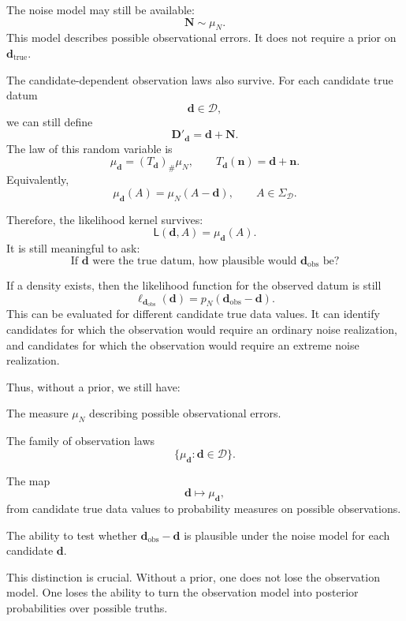 \documentclass[11pt]{article}
\newcommand{\Dspace}{\mathcal D}
\newcommand{\SigmaD}{\Sigma_{\mathcal D}}
\newcommand{\muN}{\mu_N}
\newcommand{\Dobsrand}{\mathbf D'}
\newcommand{\Nrand}{\mathbf N}
\newcommand{\dtrue}{\mathbf d_{\mathrm{true}}}
\newcommand{\dobs}{\mathbf d_{\mathrm{obs}}}
\begin{document}
The noise model may still be available:
\[
    \Nrand\sim\muN.
\]
This model describes possible observational errors. It does not require a prior on \(\dtrue\).

The candidate-dependent observation laws also survive. For each candidate true datum
\[
    \mathbf d\in\Dspace,
\]
we can still define
\[
    \Dobsrand_{\mathbf d}
    =
    \mathbf d+\Nrand.
\]
The law of this random variable is
\[
    \mu_{\mathbf d}
    =
    (T_{\mathbf d})_{\#}\muN,
    \qquad
    T_{\mathbf d}(\mathbf n)=\mathbf d+\mathbf n.
\]
Equivalently,
\[
    \mu_{\mathbf d}(A)
    =
    \muN(A-\mathbf d),
    \qquad
    A\in\SigmaD.
\]

Therefore, the likelihood kernel survives:
\[
    \mathsf L(\mathbf d,A)
    =
    \mu_{\mathbf d}(A).
\]
It is still meaningful to ask:
\[
    \text{If } \mathbf d \text{ were the true datum, how plausible would } \dobs \text{ be?}
\]

If a density exists, then the likelihood function for the observed datum is still
\[
    \ell_{\dobs}(\mathbf d)
    =
    p_N(\dobs-\mathbf d).
\]
This can be evaluated for different candidate true data values. It can identify candidates for which the observation would require an ordinary noise realization, and candidates for which the observation would require an extreme noise realization.

Thus, without a prior, we still have:
\begin{description}[leftmargin=3.2cm,style=nextline]
    \item[Noise model.]
    The measure \(\muN\) describing possible observational errors.

    \item[Sampling family.]
    The family of observation laws
    \[
        \{\mu_{\mathbf d}:\mathbf d\in\Dspace\}.
    \]

    \item[Likelihood kernel.]
    The map
    \[
        \mathbf d
        \longmapsto
        \mu_{\mathbf d},
    \]
    from candidate true data values to probability measures on possible observations.

    \item[Compatibility assessment.]
    The ability to test whether \(\dobs-\mathbf d\) is plausible under the noise model for each candidate \(\mathbf d\).
\end{description}

This distinction is crucial. Without a prior, one does not lose the observation model. One loses the ability to turn the observation model into posterior probabilities over possible truths.
\end{document}

